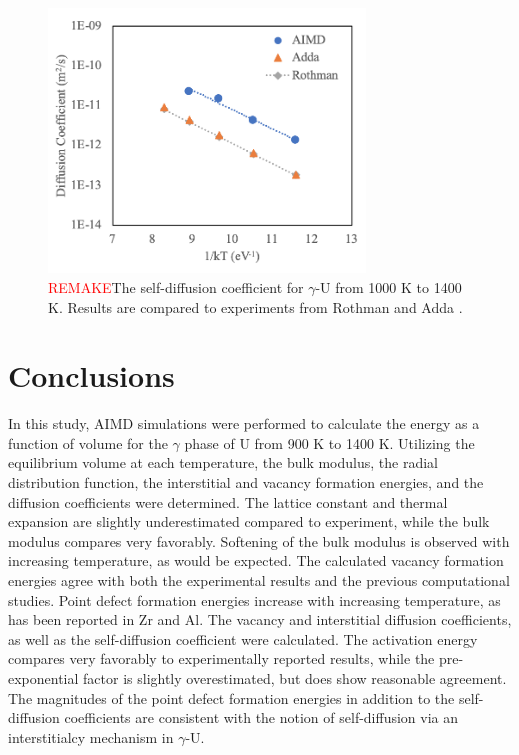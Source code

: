 \documentclass[review]{elsarticle}
\begin{document}
 \begin{figure}[h]
 \centering
 \includegraphics[width=0.75\textwidth]{self_diff.png} 
 \caption{\textcolor{red}{REMAKE}The self-diffusion coefficient for $\gamma$-U from 1000 K to 1400 K. Results are compared to experiments from Rothman \cite{rothman1959} and Adda \cite{adda1959}. }
 \label{fig:selfdiff}
\end{figure}

\FloatBarrier

\section{Conclusions}

In this study, AIMD simulations were performed to calculate the energy as a function of volume for the $\gamma$ phase of U from 900 K to 1400 K. Utilizing the equilibrium volume at each temperature, the bulk modulus, the radial distribution function, the interstitial and vacancy formation energies, and the diffusion coefficients were determined. The lattice constant and thermal expansion are slightly underestimated compared to experiment, while the bulk modulus compares very favorably. Softening of the bulk modulus is observed with increasing temperature, as would be expected. The calculated vacancy formation energies agree with both the experimental results and the previous computational studies. Point defect formation energies increase with increasing temperature, as has been reported in Zr and Al. The vacancy and interstitial diffusion coefficients, as well as the self-diffusion coefficient were calculated. The activation energy compares very favorably to experimentally reported results, while the pre-exponential factor is slightly overestimated, but does show reasonable agreement. The magnitudes of the point defect formation energies in addition to the self-diffusion coefficients are consistent with the notion of self-diffusion via an interstitialcy mechanism in $\gamma$-U. 
\end{document}
